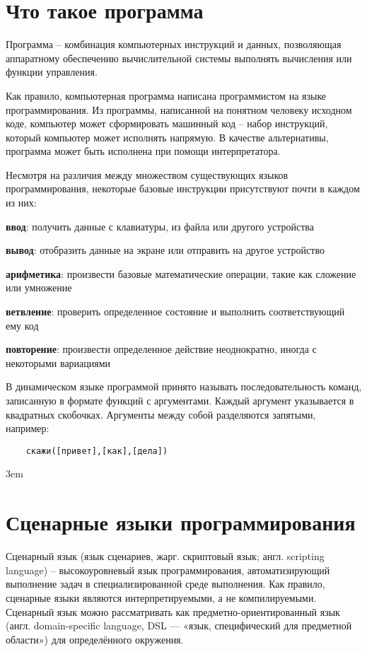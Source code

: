 \documentclass[../index.tex]{subfiles}
\begin{document}
\section{Что такое программа}

    Программа -- комбинация компьютерных инструкций и данных, позволяющая аппаратному обеспечению вычислительной системы выполнять вычисления или функции управления. 
    
    Как правило, компьютерная программа написана программистом на языке программирования. Из программы, написанной на понятном человеку исходном коде, компьютер может сформировать машинный код -- набор инструкций, который компьютер может исполнять напрямую. В качестве альтернативы, программа может быть исполнена при помощи интерпретатора.
    
    Несмотря на различия между множеством существующих языков программирования, некоторые базовые инструкции присутствуют почти в каждом из них:
    
    \textbf{ввод}: получить данные с клавиатуры, из файла или другого устройства
    
    \textbf{вывод}: отобразить данные на экране или отправить на другое устройство
    
    \textbf{арифметика}: произвести базовые математические операции, такие как сложение или умножение
    
    \textbf{ветвление}: проверить определенное состояние и выполнить соответствующий ему код
    
    \textbf{повторение}: произвести определенное действие неоднократно, иногда с некоторыми вариациями
        
        
    В динамическом языке программой принято называть последовательность команд, записанную в формате функций с аргументами.
    Каждый аргумент указывается в квадратных скобочках. Аргументы между собой разделяются запятыми, например: 
    \begin{verbatim}
    скажи([привет],[как],[дела])
    \end{verbatim}
	
     \emergencystretch 3em
    \section{Сценарные языки программирования}
        Сценарный язык (язык сценариев, жарг. скриптовый язык; англ. scripting language) -- высокоуровневый язык программирования, автоматизирующий выполнение задач в специализированной среде выполнения. 
        Как правило, сценарные языки являются интерпретируемыми, а не компилируемыми. Сценарный язык 
        можно рассматривать как предметно-ориентированный язык (англ. domain-specific language, DSL — «язык, специфический для предметной области») для определённого окружения.
        
\end{document}
